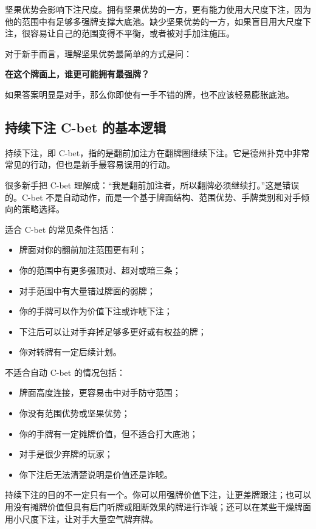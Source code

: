 坚果优势会影响下注尺度。拥有坚果优势的一方，更有能力使用大尺度下注，因为他的范围中有足够多强牌支撑大底池。缺少坚果优势的一方，如果盲目用大尺度下注，很容易让自己的范围变得不平衡，或者被对手加注施压。

对于新手而言，理解坚果优势最简单的方式是问：

\begin{center}
\textbf{在这个牌面上，谁更可能拥有最强牌？}
\end{center}

如果答案明显是对手，那么你即使有一手不错的牌，也不应该轻易膨胀底池。

\subsection{持续下注 C-bet 的基本逻辑}

持续下注，即 C-bet，指的是翻前加注方在翻牌圈继续下注。它是德州扑克中非常常见的行动，但也是新手最容易误用的行动。

很多新手把 C-bet 理解成：“我是翻前加注者，所以翻牌必须继续打。”这是错误的。C-bet 不是自动动作，而是一个基于牌面结构、范围优势、手牌类别和对手倾向的策略选择。

适合 C-bet 的常见条件包括：

\begin{itemize}
\item 牌面对你的翻前加注范围更有利；
\item 你的范围中有更多强顶对、超对或暗三条；
\item 对手范围中有大量错过牌面的弱牌；
\item 你的手牌可以作为价值下注或诈唬下注；
\item 下注后可以让对手弃掉足够多更好或有权益的牌；
\item 你对转牌有一定后续计划。
\end{itemize}

不适合自动 C-bet 的情况包括：

\begin{itemize}
\item 牌面高度连接，更容易击中对手防守范围；
\item 你没有范围优势或坚果优势；
\item 你的手牌有一定摊牌价值，但不适合打大底池；
\item 对手是很少弃牌的玩家；
\item 你下注后无法清楚说明是价值还是诈唬。
\end{itemize}

持续下注的目的不一定只有一个。你可以用强牌价值下注，让更差牌跟注；也可以用没有摊牌价值但具有后门听牌或阻断效果的牌进行诈唬；还可以在某些干燥牌面用小尺度下注，让对手大量空气牌弃牌。

